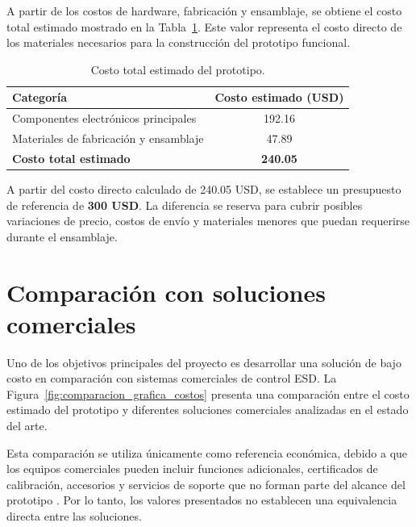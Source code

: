 A partir de los costos de hardware, fabricación y ensamblaje, se obtiene el
costo total estimado mostrado en la Tabla~\ref{tab:presupuesto_total}. Este
valor representa el costo directo de los materiales necesarios para la
construcción del prototipo funcional.

\begin{table}[H]
\centering
\caption{Costo total estimado del prototipo.}
\label{tab:presupuesto_total}
\begin{tabular}{p{8cm} c}
\toprule
\textbf{Categoría} & \textbf{Costo estimado (USD)} \\
\midrule

Componentes electrónicos principales & 192.16 \\
Materiales de fabricación y ensamblaje & 47.89 \\

\midrule
\textbf{Costo total estimado} & \textbf{240.05} \\
\bottomrule
\end{tabular}
\end{table}

A partir del costo directo calculado de 240.05 USD, se establece un presupuesto
de referencia de \textbf{300 USD}. La diferencia se reserva para cubrir posibles
variaciones de precio, costos de envío y materiales menores que puedan
requerirse durante el ensamblaje.

\section{Comparación con soluciones comerciales}

Uno de los objetivos principales del proyecto es desarrollar una solución de
bajo costo en comparación con sistemas comerciales de control ESD. La
Figura~\ref{fig:comparacion_grafica_costos} presenta una comparación entre el costo
estimado del prototipo y diferentes soluciones comerciales analizadas en el
estado del arte.

Esta comparación se utiliza únicamente como referencia económica, debido a que
los equipos comerciales pueden incluir funciones adicionales, certificados de
calibración, accesorios y servicios de soporte que no forman parte del alcance
del prototipo
\cite{SCS_770758,PGT120,PGT130DT,SmartLogPro2}. Por lo tanto, los valores
presentados no establecen una equivalencia directa entre las soluciones.

